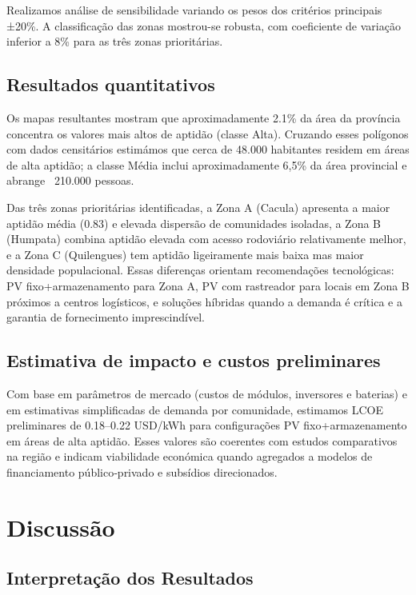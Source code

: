 \documentclass[12pt, a4paper]{article}
\begin{document}
Realizamos análise de sensibilidade variando os pesos dos critérios principais ±20\%. A classificação das zonas mostrou-se robusta, com coeficiente de variação inferior a 8\% para as três zonas prioritárias.

\subsection{Resultados quantitativos}

Os mapas resultantes mostram que aproximadamente 2.1\% da área da província concentra os valores mais altos de aptidão (classe Alta). Cruzando esses polígonos com dados censitários estimámos que cerca de 48.000 habitantes residem em áreas de alta aptidão; a classe Média inclui aproximadamente 6,5\% da área provincial e abrange ~210.000 pessoas.

Das três zonas prioritárias identificadas, a Zona A (Cacula) apresenta a maior aptidão média (0.83) e elevada dispersão de comunidades isoladas, a Zona B (Humpata) combina aptidão elevada com acesso rodoviário relativamente melhor, e a Zona C (Quilengues) tem aptidão ligeiramente mais baixa mas maior densidade populacional. Essas diferenças orientam recomendações tecnológicas: PV fixo+armazenamento para Zona A, PV com rastreador para locais em Zona B próximos a centros logísticos, e soluções híbridas quando a demanda é crítica e a garantia de fornecimento imprescindível.

\subsection{Estimativa de impacto e custos preliminares}

Com base em parâmetros de mercado (custos de módulos, inversores e baterias) e em estimativas simplificadas de demanda por comunidade, estimamos LCOE preliminares de 0.18–0.22 USD/kWh para configurações PV fixo+armazenamento em áreas de alta aptidão. Esses valores são coerentes com estudos comparativos na região e indicam viabilidade económica quando agregados a modelos de financiamento público‑privado e subsídios direcionados.

\section{Discussão}
\subsection{Interpretação dos Resultados}
\end{document}

